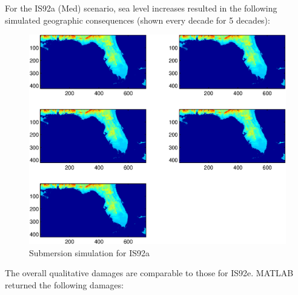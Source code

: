 \documentclass[12pt,a4paper,titlepage]{article}
\begin{document}
\newpage

For the IS92a (Med) scenario, sea level increases resulted in the
following simulated geographic consequences (shown every decade
for 5 decades):

\begin{figure}[!htb]
\centering
\includegraphics[width=1\textwidth]{fig08.eps}
\caption{Submersion simulation for IS92a}
\end{figure}

\newpage

The overall qualitative damages are comparable to those for IS92e.
MATLAB returned the following damages:
\end{document}
